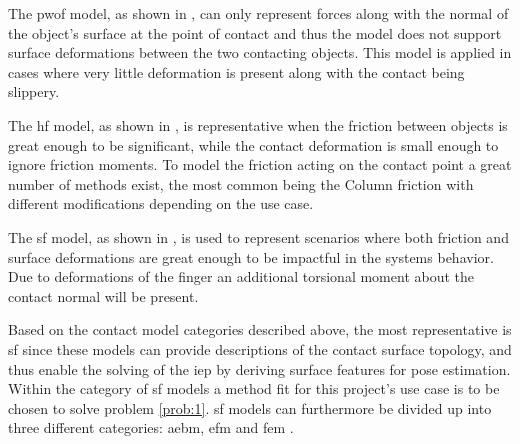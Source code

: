 The \gls{pwof} model, as shown in , can only represent forces along with the normal of the object's surface at the point of contact and thus the model does not support surface deformations between the two contacting objects. This model is applied in cases where very little deformation is present along with the contact being slippery\cite[Chapter 38]{handbook-of-robotics}.\medskip

The \gls{hf} model, as shown in , is representative when the friction between objects is great enough to be significant, while the contact deformation is small enough to ignore friction moments\cite[Chapter 38]{handbook-of-robotics}. To model the friction acting on the contact point a great number of methods exist, the most common being the Column friction with different modifications depending on the use case\fakecite. \medskip

The \gls{sf} model, as shown in , is used to represent scenarios where both friction and surface deformations are great enough to be impactful in the systems behavior. Due to deformations of the finger an additional torsional moment about the contact normal will be present.
\cite[Chapter 38]{handbook-of-robotics}  \medskip



Based on the contact model categories described above, the most representative is \gls{sf} since these models can provide descriptions of the contact surface topology, and thus enable the solving of the \gls{iep} by deriving surface features for pose estimation. Within the category of \gls{sf} models a method fit for this project's use case is to be chosen to solve problem \ref{prob:1}. \gls{sf} models can furthermore be divided up into three different categories: \gls{aebm}, \gls{efm} and \gls{fem} \cite{a-modified-elastic-foundation-contact-model-for-application-in-3d-models-of-the-prosthetic-knee}. \medskip



% 




